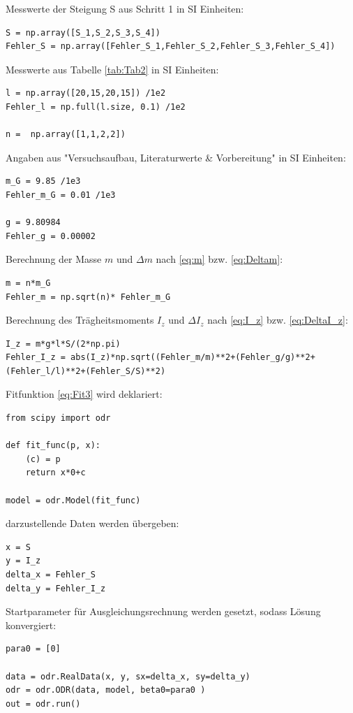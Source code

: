 \documentclass[a4paper,10pt]{article}
\begin{document}
Messwerte der Steigung S aus Schritt 1 in SI Einheiten:
\begin{lstlisting}
S = np.array([S_1,S_2,S_3,S_4])
Fehler_S = np.array([Fehler_S_1,Fehler_S_2,Fehler_S_3,Fehler_S_4])

\end{lstlisting}

Messwerte aus Tabelle \ref{tab:Tab2} in SI Einheiten:\begin{lstlisting}
l = np.array([20,15,20,15]) /1e2
Fehler_l = np.full(l.size, 0.1) /1e2

n =  np.array([1,1,2,2])

\end{lstlisting}

Angaben aus "Versuchsaufbau, Literaturwerte \& Vorbereitung"  in SI Einheiten:\begin{lstlisting}
m_G = 9.85 /1e3 
Fehler_m_G = 0.01 /1e3

g = 9.80984
Fehler_g = 0.00002

\end{lstlisting}

Berechnung der Masse  \(m\) und \(\Delta m\) nach \eqref{eq:m} bzw. \eqref{eq:Deltam}:\begin{lstlisting}
m = n*m_G
Fehler_m = np.sqrt(n)* Fehler_m_G

\end{lstlisting}

Berechnung des Trägheitsmoments \(I_z\) und \(\Delta I_z\) nach \eqref{eq:I_z} bzw. \eqref{eq:DeltaI_z}:\begin{lstlisting}
I_z = m*g*l*S/(2*np.pi)
Fehler_I_z = abs(I_z)*np.sqrt((Fehler_m/m)**2+(Fehler_g/g)**2+(Fehler_l/l)**2+(Fehler_S/S)**2)

\end{lstlisting}

Fitfunktion \eqref{eq:Fit3} wird deklariert:\begin{lstlisting}
from scipy import odr

def fit_func(p, x):
    (c) = p
    return x*0+c

model = odr.Model(fit_func)

\end{lstlisting}

darzustellende Daten werden übergeben:\begin{lstlisting}
x = S
y = I_z
delta_x = Fehler_S
delta_y = Fehler_I_z

\end{lstlisting}

Startparameter für Ausgleichungsrechnung werden gesetzt, sodass Lösung konvergiert:\begin{lstlisting}
para0 = [0]

data = odr.RealData(x, y, sx=delta_x, sy=delta_y)
odr = odr.ODR(data, model, beta0=para0 )
out = odr.run()

\end{lstlisting}
\end{document}
